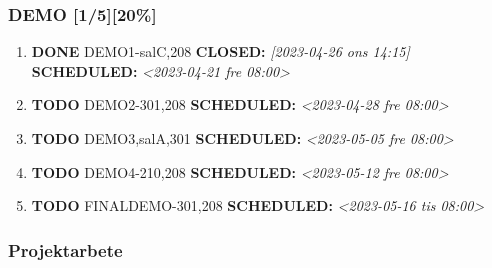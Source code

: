 \documentclass[11pt]{article}
\begin{document}
\subsubsection{DEMO [1/5][20\%]}
\label{sec:org705f8bf}
\begin{enumerate}
\item {\bfseries\sffamily DONE} DEMO1-salC,208
\label{sec:org31f25a4}
\noindent\textbf{CLOSED:} \textit{[2023-04-26 ons 14:15] } \textbf{SCHEDULED:} \textit{<2023-04-21 fre 08:00>}\\[0pt]
\item {\bfseries\sffamily TODO} DEMO2-301,208
\label{sec:org8a7b96c}
\noindent\textbf{SCHEDULED:} \textit{<2023-04-28 fre 08:00>}\\[0pt]
\item {\bfseries\sffamily TODO} DEMO3,salA,301
\label{sec:org46517e1}
\noindent\textbf{SCHEDULED:} \textit{<2023-05-05 fre 08:00>}\\[0pt]
\item {\bfseries\sffamily TODO} DEMO4-210,208
\label{sec:org059e3a4}
\noindent\textbf{SCHEDULED:} \textit{<2023-05-12 fre 08:00>}\\[0pt]
\item {\bfseries\sffamily TODO} FINALDEMO-301,208
\label{sec:org1894f81}
\noindent\textbf{SCHEDULED:} \textit{<2023-05-16 tis 08:00>}\\[0pt]
\end{enumerate}

\subsubsection{Projektarbete}
\label{sec:org39bcd3f}
\end{document}
